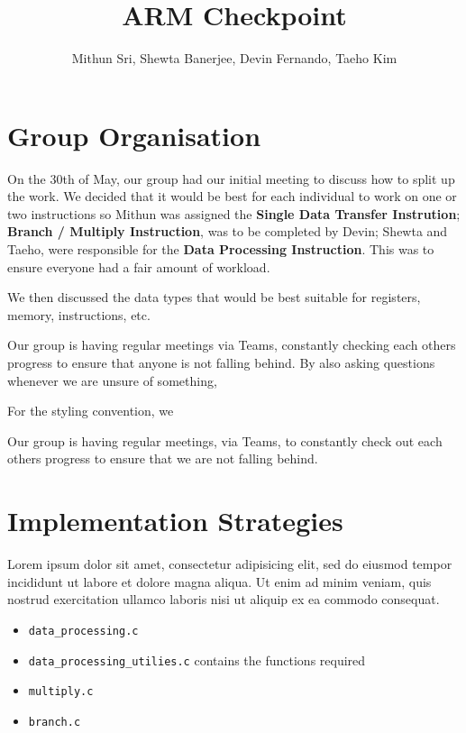 \documentclass[11pt]{article}
\begin{document}
\title{ARM Checkpoint}
\author{Mithun Sri, Shewta Banerjee, Devin Fernando, Taeho Kim}

\maketitle

\section{Group Organisation}


\quad On the 30th of May, our group had our initial meeting to discuss how to split up the work. We decided that it would be best for each individual to work on one or two instructions so Mithun was assigned the {\bf Single Data Transfer Instrution}; {\bf Branch / Multiply Instruction}, was to be completed by Devin; Shewta and Taeho, were responsible for the {\bf Data Processing Instruction}. This was to ensure everyone had a fair amount of workload. 

We then discussed the data types that would be best suitable for registers, memory, instructions, etc.

Our group is having regular meetings via Teams, constantly checking each others progress to ensure that anyone is not falling behind. By also asking questions whenever we are unsure of something, 

For the styling convention, we 



Our group is having regular meetings, via Teams, to constantly check out each others progress to ensure that we are not falling behind. 

\section{Implementation Strategies}

Lorem ipsum dolor sit amet, consectetur adipisicing elit, sed do eiusmod tempor
incididunt ut labore et dolore magna aliqua. Ut enim ad minim veniam, quis
nostrud exercitation ullamco laboris nisi ut aliquip ex ea commodo consequat.

\begin{itemize}
    \item \texttt{data\_processing.c}
    \item \texttt{data\_processing\_utilies.c} contains the functions required 
    \item \texttt{multiply.c}
    \item \texttt{branch.c}
\end{itemize}
\end{document}
